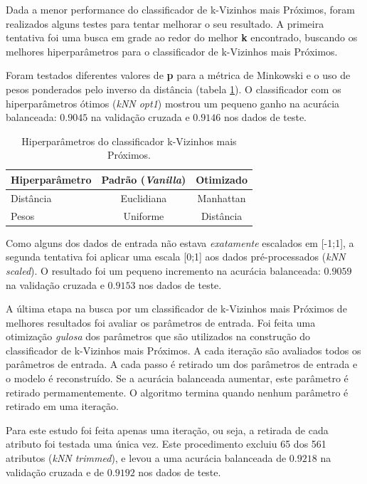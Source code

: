 \documentclass[final,5p]{elsarticle}
\numberwithin{equation}{section}
\begin{document}
        Dada a menor performance do classificador de k-Vizinhos mais Próximos, foram realizados alguns testes para tentar melhorar o seu resultado. A primeira tentativa foi uma busca em grade ao redor do melhor \textbf{k} encontrado, buscando os melhores hiperparâmetros para o classificador de k-Vizinhos mais Próximos.

        Foram testados diferentes valores de \textbf{p} para a métrica de Minkowski e o uso de pesos ponderados pelo inverso da distância (tabela \ref{tab:parâmetros_knn}). O classificador com os hiperparâmetros ótimos (\emph{kNN opt1}) mostrou um pequeno ganho na acurácia balanceada: $0.9045$ na validação cruzada e $0.9146$ nos dados de teste.

        \begin{table}[h]
            \centering
            \begin{tabular}{l c c}
                \toprule
                \textbf{Hiperparâmetro} & \textbf{Padrão (\emph{Vanilla})}  & \textbf{Otimizado} \\
                \midrule
                Distância    & Euclidiana & Manhattan \\
                Pesos    & Uniforme & Distância \\
                \bottomrule
            \end{tabular}
            \caption{Hiperparâmetros do classificador k-Vizinhos mais Próximos.}
            \label{tab:parâmetros_knn}
        \end{table}

        Como alguns dos dados de entrada não estava \emph{exatamente} escalados em [-1;1], a segunda tentativa foi aplicar uma escala [0;1] aos dados pré-processados (\emph{kNN scaled}). O resultado foi um pequeno incremento na acurácia balanceada: $0.9059$ na validação cruzada e $0.9153$ nos dados de teste.

        A última etapa na busca por um classificador de k-Vizinhos mais Próximos de melhores resultados foi avaliar os parâmetros de entrada. Foi feita uma otimização \emph{gulosa} dos parâmetros que são utilizados na construção do classificador de k-Vizinhos mais Próximos. A cada iteração são avaliados todos os parâmetros de entrada. A cada passo é retirado um dos parâmetros de entrada e o modelo é reconstruído. Se a acurácia balanceada aumentar, este parâmetro é retirado permamentemente. O algoritmo termina quando nenhum parâmetro é retirado em uma iteração.

        Para este estudo foi feita apenas uma iteração, ou seja, a retirada de cada atributo foi testada uma única vez. Este procedimento excluiu 65 dos 561 atributos (\emph{kNN trimmed}), e levou a uma acurácia balanceada de $0.9218$ na validação cruzada e de $0.9192$ nos dados de teste.
\end{document}
